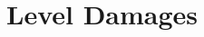\documentclass[../../main.tex]{subfiles}
\begin{document}
\section{Level Damages} \label{appendix:level-damages}

\end{document}

